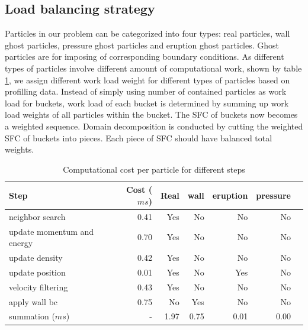 \documentclass[procedia]{easychair}
\begin{document}
\subsection{Load balancing strategy}
\label{sect:load_balance}
Particles in our problem can be categorized into four types: real particles, wall ghost particles, pressure ghost particles and eruption ghost particles. Ghost particles are for imposing of corresponding boundary conditions. As different types of particles involve different amount of computational work, shown by table \ref{tab:Computational_cost_steps}, we assign different work load weight for different types of particles based on profilling data. Instead of simply using number of contained particles as work load for buckets, work load of each bucket is determined by summing up work load weights of all particles within the bucket. The SFC of buckets now becomes a weighted sequence. Domain decomposition  is conducted by cutting the weighted SFC of buckets into pieces. Each piece of SFC should have balanced total weights.
\begin{table}[htp]
	\begin{centering}
	\caption{Computational cost per particle for different steps}		
	  \begin{tabular}{lrrrrrr}
	    \hline
	    Step & Cost ($ms$) & Real & wall & eruption & pressure\\
	    \hline
	    neighbor search & 0.41 & Yes & No & No & No \\
	    update momentum and energy & 0.70 & Yes & No & No & No\\
	    update density & 0.42 & Yes & No & No & No \\
	    update position & 0.01 & Yes & No & Yes &  No\\
	    velocity filtering& 0.43 & Yes & No & No & No\\
	    apply wall bc     & 0.75 & No & Yes & No & No\\
	    summation ($ms$) & - & 1.97 & 0.75 & 0.01 & 0.00\\
	    \hline
	  \end{tabular}
	  \label{tab:Computational_cost_steps}	
	\end{centering}
\end{table}
%
\end{document}
